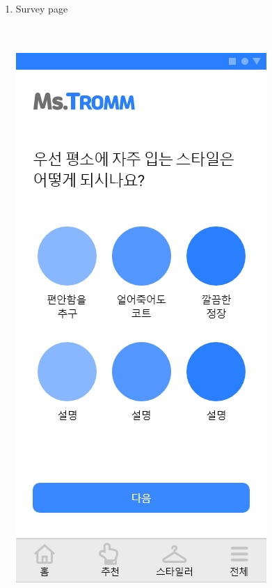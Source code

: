 \documentclass[conference]{IEEEtran}
\begin{document}
\begin{enumerate}
\begin{enumerate}
\begin{itemize}
        \end{itemize} 
            \item Survey page \\ \\ \\
            \centerline{\includegraphics[scale=0.17]{5-1. 설문.jpg}
}
\end{enumerate}
\end{enumerate}
\end{document}
